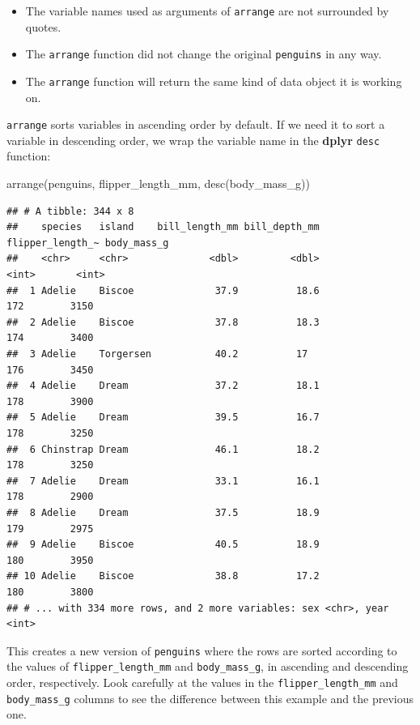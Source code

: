 \documentclass[
]{book}
\newenvironment{Shaded}{\begin{snugshade}}{\end{snugshade}}
\newcommand{\FunctionTok}[1]{\textcolor[rgb]{0.00,0.00,0.00}{#1}}
\newcommand{\NormalTok}[1]{#1}
\providecommand{\tightlist}{%
  \setlength{\itemsep}{0pt}\setlength{\parskip}{0pt}}
\begin{document}
\begin{itemize}
\tightlist
\item
  The variable names used as arguments of \texttt{arrange} are not surrounded by quotes.
\item
  The \texttt{arrange} function did not change the original \texttt{penguins} in any way.
\item
  The \texttt{arrange} function will return the same kind of data object it is working on.
\end{itemize}

\texttt{arrange} sorts variables in ascending order by default. If we need it to sort a variable in descending order, we wrap the variable name in the \textbf{dplyr} \texttt{desc} function:

\begin{Shaded}
\begin{Highlighting}[]
\FunctionTok{arrange}\NormalTok{(penguins, flipper\_length\_mm, }\FunctionTok{desc}\NormalTok{(body\_mass\_g))}
\end{Highlighting}
\end{Shaded}

\begin{verbatim}
## # A tibble: 344 x 8
##    species   island    bill_length_mm bill_depth_mm flipper_length_~ body_mass_g
##    <chr>     <chr>              <dbl>         <dbl>            <int>       <int>
##  1 Adelie    Biscoe              37.9          18.6              172        3150
##  2 Adelie    Biscoe              37.8          18.3              174        3400
##  3 Adelie    Torgersen           40.2          17                176        3450
##  4 Adelie    Dream               37.2          18.1              178        3900
##  5 Adelie    Dream               39.5          16.7              178        3250
##  6 Chinstrap Dream               46.1          18.2              178        3250
##  7 Adelie    Dream               33.1          16.1              178        2900
##  8 Adelie    Dream               37.5          18.9              179        2975
##  9 Adelie    Biscoe              40.5          18.9              180        3950
## 10 Adelie    Biscoe              38.8          17.2              180        3800
## # ... with 334 more rows, and 2 more variables: sex <chr>, year <int>
\end{verbatim}

This creates a new version of \texttt{penguins} where the rows are sorted according to the values of \texttt{flipper\_length\_mm} and \texttt{body\_mass\_g}, in ascending and descending order, respectively. Look carefully at the values in the \texttt{flipper\_length\_mm} and \texttt{body\_mass\_g} columns to see the difference between this example and the previous one.
\end{document}
